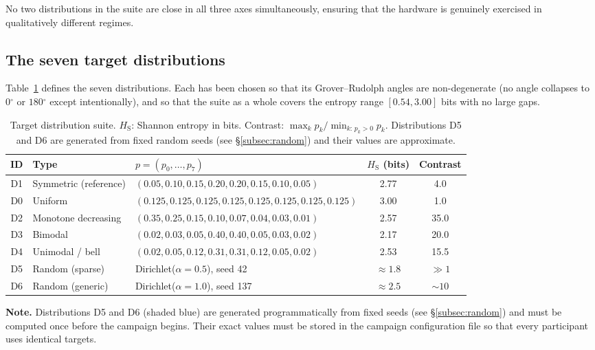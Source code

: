 \documentclass[11pt,a4paper]{article}
\providecommand{\dg}{\ensuremath{{}^{\circ}}}
\newcommand{\HS}{H_{\mathrm{S}}}
\begin{document}
\noindent No two distributions in the suite are close in all three
axes simultaneously, ensuring that the hardware is genuinely
exercised in qualitatively different regimes.

\subsection{The seven target distributions}
\label{subsec:distributions}

Table~\ref{tab:distributions} defines the seven distributions.
Each has been chosen so that its Grover--Rudolph angles are
non-degenerate (no angle collapses to $0\dg{}$ or $180\dg{}$ except
intentionally), and so that the suite as a whole covers the
entropy range $[0.54, 3.00]$ bits with no large gaps.

\begin{table}[H]
\centering
\caption{Target distribution suite. $\HS$: Shannon entropy in bits.
Contrast: $\max_k p_k / \min_{k:\,p_k>0} p_k$.
Distributions D5 and D6 are generated from fixed random seeds
(see \S\ref{subsec:random}) and their values are approximate.}
\label{tab:distributions}
\setlength{\tabcolsep}{6pt}
\begin{tabular}{clp{8cm}cc}
\toprule
ID & Type & $p = (p_0,\ldots,p_7)$ & $\HS$ (bits) & Contrast \\
\midrule
\rowcolor{refcolor}
D1 & Symmetric (reference) &
  $(0.05, 0.10, 0.15, 0.20, 0.20, 0.15, 0.10, 0.05)$ &
  2.77 & 4.0 \\
D0 & Uniform &
  $(0.125, 0.125, 0.125, 0.125, 0.125, 0.125, 0.125, 0.125)$ &
  3.00 & 1.0 \\
D2 & Monotone decreasing &
  $(0.35, 0.25, 0.15, 0.10, 0.07, 0.04, 0.03, 0.01)$ &
  2.57 & 35.0 \\
D3 & Bimodal &
  $(0.02, 0.03, 0.05, 0.40, 0.40, 0.05, 0.03, 0.02)$ &
  2.17 & 20.0 \\
D4 & Unimodal / bell &
  $(0.02, 0.05, 0.12, 0.31, 0.31, 0.12, 0.05, 0.02)$ &
  2.53 & 15.5 \\
\rowcolor{newcolor}
D5 & Random (sparse) &
  Dirichlet($\alpha=0.5$), seed 42 &
  $\approx 1.8$ & $\gg 1$ \\
\rowcolor{newcolor}
D6 & Random (generic) &
  Dirichlet($\alpha=1.0$), seed 137 &
  $\approx 2.5$ & $\sim 10$ \\
\bottomrule
\end{tabular}
\end{table}

\noindent\textcolor{blue!60!black}{\textbf{Note.}}
Distributions D5 and D6 (shaded blue) are generated
programmatically from fixed seeds (see \S\ref{subsec:random})
and must be computed once before the campaign begins.
Their exact values must be stored in the campaign configuration
file so that every participant uses identical targets.
\end{document}
